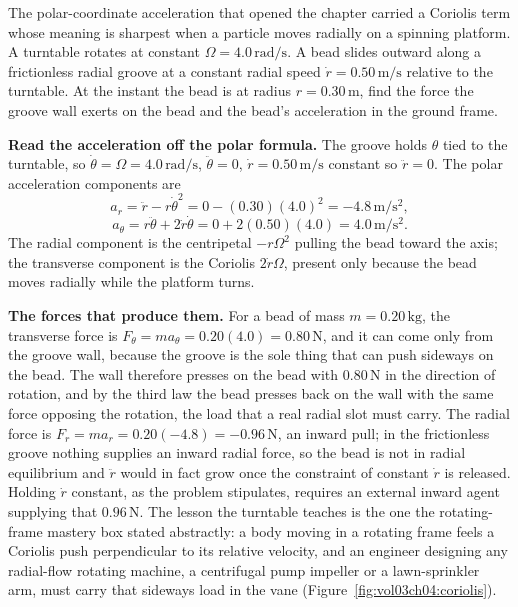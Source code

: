 The polar-coordinate acceleration that opened the chapter carried a
Coriolis term whose meaning is sharpest when a particle moves radially
on a spinning platform. A turntable rotates at constant
$\Omega=4.0\,\si{\radian\per\second}$. A bead slides outward along a
frictionless radial groove at a constant radial speed $\dot{r}=0.50\,
\si{\meter\per\second}$ relative to the turntable. At the instant the
bead is at radius $r=0.30\,\si{\meter}$, find the force the groove wall
exerts on the bead and the bead's acceleration in the ground frame.

\textbf{Read the acceleration off the polar formula.} The groove holds
$\theta$ tied to the turntable, so $\dot{\theta}=\Omega=4.0\,\si{\radian
\per\second}$, $\ddot{\theta}=0$, $\dot{r}=0.50\,\si{\meter\per\second}$
constant so $\ddot{r}=0$. The polar acceleration components are
\[
a_{r}=\ddot{r}-r\dot{\theta}^{2}=0-(0.30)(4.0)^{2}=-4.8\,\si{\meter\per
\second\squared},
\]
\[
a_{\theta}=r\ddot{\theta}+2\dot{r}\dot{\theta}=0+2(0.50)(4.0)=4.0\,\si{
\meter\per\second\squared}.
\]
The radial component is the centripetal $-r\Omega^{2}$ pulling the bead
toward the axis; the transverse component is the Coriolis $2\dot{r}
\Omega$, present only because the bead moves radially while the platform
turns.

\textbf{The forces that produce them.} For a bead of mass $m=0.20\,\si{
\kilogram}$, the transverse force is $F_{\theta}=ma_{\theta}=0.20(4.0)=
0.80\,\si{\newton}$, and it can come only from the groove wall, because
the groove is the sole thing that can push sideways on the bead. The
wall therefore presses on the bead with $0.80\,\si{\newton}$ in the
direction of rotation, and by the third law the bead presses back on
the wall with the same force opposing the rotation, the load that a
real radial slot must carry. The radial force is $F_{r}=ma_{r}=0.20(
-4.8)=-0.96\,\si{\newton}$, an inward pull; in the frictionless groove
nothing supplies an inward radial force, so the bead is not in radial
equilibrium and $\ddot{r}$ would in fact grow once the constraint of
constant $\dot{r}$ is released. Holding $\dot{r}$ constant, as the
problem stipulates, requires an external inward agent supplying that
$0.96\,\si{\newton}$. The lesson the turntable teaches is the one the
rotating-frame mastery box stated abstractly: a body moving in a
rotating frame feels a Coriolis push perpendicular to its relative
velocity, and an engineer designing any radial-flow rotating machine,
a centrifugal pump impeller or a lawn-sprinkler arm, must carry that
sideways load in the vane (Figure~\ref{fig:vol03ch04:coriolis}).

